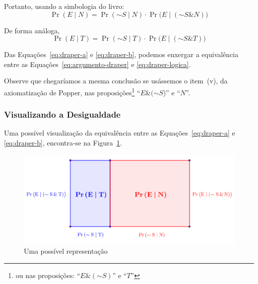 \documentclass[12pt]{article}
\theoremstyle{definition}
\newcommand{\N}{\ensuremath{\sim\!}}
\begin{document}
		Portanto, usando a simbologia do livro:
		\footnotesize
		\begin{equation}\label{eq:draper-a}
		 \Pr{(E \mid N)} = \Pr{(\N S \mid N)} \cdot \Pr{\Big(E \mid (\N S \& N)\Big)}
		\end{equation}
		\normalsize
		
		De forma análoga,
		\footnotesize
		\begin{equation}\label{eq:draper-b}
		 \Pr{(E \mid T)} = \Pr{(\N S \mid T)} \cdot \Pr{\Big(E \mid (\N S \& T)\Big)}
		\end{equation}
		\normalsize
		
		Das Equações~\eqref{eq:draper-a} e \eqref{eq:draper-b}, podemos enxergar a
		equivalência entre as Equações~\eqref{eq:argumento-draper} e 
		\eqref{eq:draper-logica}.
		
		Observe que chegaríamos a mesma conclusão se usássemos o item~(v), da 
		axiomatização de Popper, nas proposições\footnote{ou nas proposições:
		``$E \& (\N S)$'' e ``$T$''} ``$E \& (\N S$)'' e ``$N$''.

 \subsubsection{Visualizando a Desigualdade}
	 Uma possível visualização da equivalência entre as 
		Equações~\eqref{eq:draper-a} e \eqref{eq:draper-b}, encontra-se na 
		Figura~\ref{fig:draper-visu}.
		
	 \begin{figure}[!htbp]%
		\centering
		\includegraphics[width=\textwidth]{diagrama-visu}%
		\caption{Uma possível representação}%
		\label{fig:draper-visu}%
		\end{figure}
		
\end{document}
